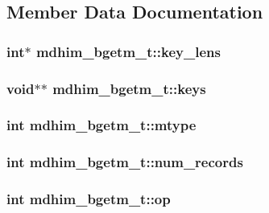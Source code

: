 \subsection{Member Data Documentation}
\hypertarget{structmdhim__bgetm__t_a1bda084b30e5429093159a78827efb52}{
\subsubsection[{key\-\_\-lens}]{\setlength{\rightskip}{0pt plus 5cm}int$\ast$ mdhim\-\_\-bgetm\-\_\-t\-::key\-\_\-lens}}\label{structmdhim__bgetm__t_a1bda084b30e5429093159a78827efb52}
\hypertarget{structmdhim__bgetm__t_a6abc6929954a3e7aab4b71f12b9db668}{
\subsubsection[{keys}]{\setlength{\rightskip}{0pt plus 5cm}void$\ast$$\ast$ mdhim\-\_\-bgetm\-\_\-t\-::keys}}\label{structmdhim__bgetm__t_a6abc6929954a3e7aab4b71f12b9db668}
\hypertarget{structmdhim__bgetm__t_aa52b25716fcf7fdc26af4dd48056d976}{
\subsubsection[{mtype}]{\setlength{\rightskip}{0pt plus 5cm}int mdhim\-\_\-bgetm\-\_\-t\-::mtype}}\label{structmdhim__bgetm__t_aa52b25716fcf7fdc26af4dd48056d976}
\hypertarget{structmdhim__bgetm__t_af952f7de3351ee73515c1948c5faf927}{
\subsubsection[{num\-\_\-records}]{\setlength{\rightskip}{0pt plus 5cm}int mdhim\-\_\-bgetm\-\_\-t\-::num\-\_\-records}}\label{structmdhim__bgetm__t_af952f7de3351ee73515c1948c5faf927}
\hypertarget{structmdhim__bgetm__t_aa4e54e836da625bad6ebc439c5f9e047}{
\subsubsection[{op}]{\setlength{\rightskip}{0pt plus 5cm}int mdhim\-\_\-bgetm\-\_\-t\-::op}}\label{structmdhim__bgetm__t_aa4e54e836da625bad6ebc439c5f9e047}
